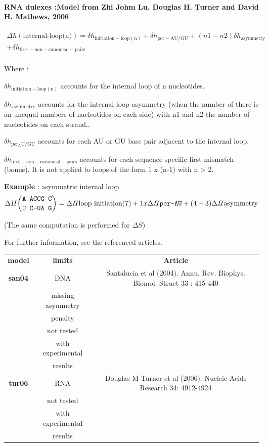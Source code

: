 \documentclass{article}
\begin{document}
\paragraph{RNA dulexes :\textbf{Model from Zhi Johm Lu, Douglas H. Turner and David H. Mathews, 2006}}

\begin{multline*}
\Delta h {(\mbox{internal-loop(n)})} =
\delta{}h_\mathrm{initiation-loop(n)} +
\delta{}h_\mathrm{per-AU/GU} +
(n1 - n2) \delta{}h_\mathrm{asymmetry} \\ +
\delta{}h_\mathrm{first-non-canonical-pairs}\\
\end{multline*}


Where :

$\delta{}h_\mathrm{initiation-loop(n)}$ accounts for the internal loop of n nucleotides.

$\delta{}h_\mathrm{asymmetry}$ accounts for the internal loop asymmetry (when the number of
there is an unequal numbers of nucleotides on each side) with n1 and n2 the
number of nucleotides on each strand..

$\delta{}h_\mathrm{per_AU/GU}$ accounts for each AU or GU base pair adjacent
to the internal loop.

$\delta{}h_\mathrm{first-non-canonical-pairs}$ accounts for each sequence
specific first mismatch (bonus). It is not applied to loops of the form 1 x (n-1) with
n > 2.


\textbf{Example} : asymmetric internal loop
\begin{multline*}
\Delta H {\mbox{\texttt{A ACCG C}} \choose \mbox{\texttt{U C-UA G}}} = 
\Delta H {\mbox{loop initiation(7)}} +
1 x \Delta H {\mbox{\texttt{per-AU}}} +
(4 - 3)\Delta H {\mbox{asymmetry}}\\
\end{multline*}

       (The same computation is performed for $\Delta S$)    
       
For further information, see the referenced articles.

\begin{table}[h]
\begin{tabular}[h]{| c | c | c |}
\textbf{model} & \textbf{limits} & \textbf{Article} \\
\textbf{san04} & DNA & Santalucia et al (2004). Annu. Rev. Biophys. Biomol. Struct 33 : 415-440\\
 & missing asymmetry & \\
 & penalty & \\
 & not tested & \\
 & with experimental & \\
 & results & \\
\textbf{tur06} & RNA & Douglas M Turner et al (2006). Nucleic Acids Research 34: 4912-4924 \\
 & not tested & \\
 & with experimental & \\
 & results & \\
\end{tabular}
\end{table}
\end{document}
